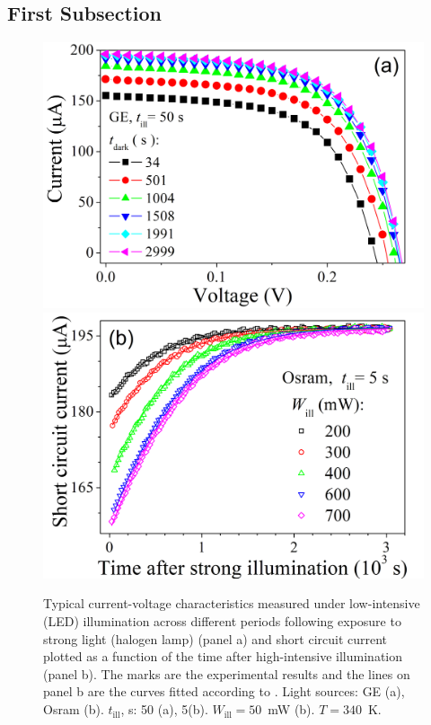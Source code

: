 \documentclass{WileyMSP-template}
\begin{document}
\subsection{First Subsection}

\begin{figure}
\centering
  \includegraphics[width=0.4\linewidth]{Fig2a.png}
  \includegraphics[width=0.4\linewidth]{Fig2b.png}
  \caption{Typical current-voltage characteristics measured
  under low-intensive (LED) illumination across different periods following exposure to strong light (halogen lamp) (panel a) and
  short circuit current plotted as a function of the time after high-intensive illumination (panel b).
  The marks are the experimental results and the lines on panel b are the curves fitted according to \cite{Olikh2022:JMatSci,Olikh2021JAP}.
  Light sources: GE (a), Osram (b).
  $t_\mathrm{ill}$, s: 50 (a), 5(b).
  $W_\mathrm{ill}=50$~mW (b).
  $T=340$~K.}
  \label{fig2}
\end{figure}
\end{document}
